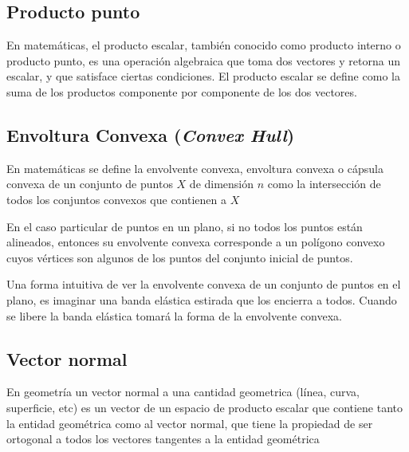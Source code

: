 \subsection{Producto punto}

En matemáticas, el producto escalar, también conocido como producto interno o producto punto, es una operación algebraica que toma dos vectores y retorna un escalar, y que satisface ciertas condiciones. El producto escalar se define como la suma de los productos componente por componente de los dos vectores.



\subsection{Envoltura Convexa (\emph{Convex Hull})}

En matemáticas se define la envolvente convexa, envoltura convexa o cápsula convexa de un conjunto de puntos $X$ de dimensión $n$ como la intersección de todos los conjuntos convexos que contienen a $X$

En el caso particular de puntos en un plano, si no todos los puntos están alineados, entonces su envolvente convexa corresponde a un polígono convexo cuyos vértices son algunos de los puntos del conjunto inicial de puntos.

Una forma intuitiva de ver la envolvente convexa de un conjunto de puntos en el plano, es imaginar una banda elástica estirada que los encierra a todos. Cuando se libere la banda elástica tomará la forma de la envolvente convexa.

\subsection{Vector normal}
En geometría un vector normal a una cantidad geometrica (línea, curva, superficie, etc) es un vector de un espacio de producto escalar que contiene tanto la entidad geométrica como al vector normal, que tiene la propiedad de ser ortogonal a todos los vectores tangentes a la entidad geométrica  